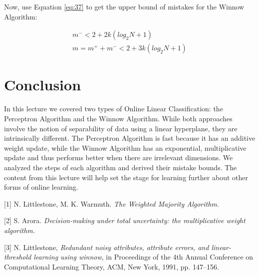 \documentclass[11pt]{article}
\begin{document}
Now, use Equation \ref{eq:37} to get the upper bound of mistakes for the Winnow Algorithm:

\begin{align}
    m^- < 2 + 2k(log_2N + 1) \\
    m = m^+ + m^- < 2 + 3k(log_2N + 1)
\end{align}

\section{Conclusion}

In this lecture we covered two types of Online Linear Classification: the Perceptron Algorithm and the Winnow Algorithm. While both approaches involve the notion of separability of data using a linear hyperplane, they are intrinsically different. The Perceptron Algorithm is fast because it has an additive weight update, while the Winnow Algorithm has an exponential, multiplicative update and thus performs better when there are irrelevant dimensions. We analyzed the steps of each algorithm and derived their mistake bounds. The content from this lecture will help set the stage for learning further about other forms of online learning.

{


}

[1] N. Littlestone, M. K. Warmuth. \textit{The Weighted Majority Algorithm.}

[2] S. Arora. \textit{Decision-making under total uncertainty: the multiplicative weight algorithm.}

[3] N. Littlestone, \textit{Redundant noisy attributes, attribute errors, and linear-threshold learning using winnow}, in Proceedings of the 4th Annual Conference on Computational Learning Theory, ACM, New York, 1991, pp. 147–156.



\end{document}
